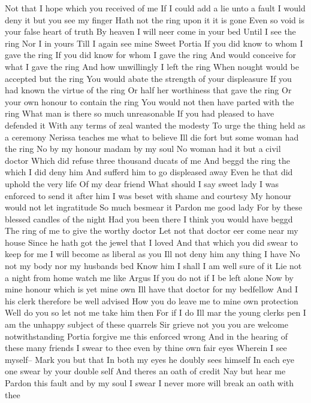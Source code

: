 Not that I hope which you received of me 
If I could add a lie unto a fault 
I would deny it but you see my finger 
Hath not the ring upon it it is gone 
Even so void is your false heart of truth 
By heaven I will neer come in your bed 
Until I see the ring 
Nor I in yours 
Till I again see mine 
Sweet Portia 
If you did know to whom I gave the ring 
If you did know for whom I gave the ring 
And would conceive for what I gave the ring 
And how unwillingly I left the ring 
When nought would be accepted but the ring 
You would abate the strength of your displeasure 
If you had known the virtue of the ring 
Or half her worthiness that gave the ring 
Or your own honour to contain the ring 
You would not then have parted with the ring 
What man is there so much unreasonable 
If you had pleased to have defended it 
With any terms of zeal wanted the modesty 
To urge the thing held as a ceremony 
Nerissa teaches me what to believe 
Ill die fort but some woman had the ring 
No by my honour madam by my soul 
No woman had it but a civil doctor 
Which did refuse three thousand ducats of me 
And beggd the ring the which I did deny him 
And sufferd him to go displeased away 
Even he that did uphold the very life 
Of my dear friend What should I say sweet lady 
I was enforced to send it after him 
I was beset with shame and courtesy 
My honour would not let ingratitude 
So much besmear it Pardon me good lady 
For by these blessed candles of the night 
Had you been there I think you would have beggd 
The ring of me to give the worthy doctor 
Let not that doctor eer come near my house 
Since he hath got the jewel that I loved 
And that which you did swear to keep for me 
I will become as liberal as you 
Ill not deny him any thing I have 
No not my body nor my husbands bed 
Know him I shall I am well sure of it 
Lie not a night from home watch me like Argus 
If you do not if I be left alone 
Now by mine honour which is yet mine own 
Ill have that doctor for my bedfellow 
And I his clerk therefore be well advised 
How you do leave me to mine own protection 
Well do you so let not me take him then 
For if I do Ill mar the young clerks pen 
I am the unhappy subject of these quarrels 
Sir grieve not you you are welcome notwithstanding 
Portia forgive me this enforced wrong 
And in the hearing of these many friends 
I swear to thee even by thine own fair eyes 
Wherein I see myself-- 
Mark you but that 
In both my eyes he doubly sees himself 
In each eye one swear by your double self 
And theres an oath of credit 
Nay but hear me 
Pardon this fault and by my soul I swear 
I never more will break an oath with thee 

